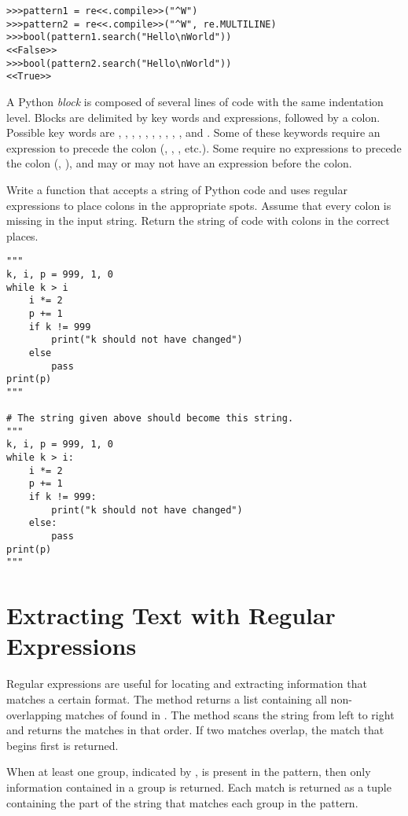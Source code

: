 \begin{lstlisting}
>>>pattern1 = re<<.compile>>("^W")
>>>pattern2 = re<<.compile>>("^W", re.MULTILINE)
>>>bool(pattern1.search("Hello\nWorld"))
<<False>>
>>>bool(pattern2.search("Hello\nWorld"))
<<True>>
\end{lstlisting}

\begin{problem}
A Python \emph{block} is composed of several lines of code with the same indentation level.
Blocks are delimited by key words and expressions, followed by a colon.
Possible key words are , , , , , , , , , , and .
Some of these keywords require an expression to precede the colon (, , , etc.).
Some require no expressions to precede the colon (, ), and  may or may not have an expression before the colon.

Write a function that accepts a string of Python code and uses regular expressions to place colons in the appropriate spots.
Assume that every colon is missing in the input string.
Return the string of code with colons in the correct places.

\begin{lstlisting}
"""
k, i, p = 999, 1, 0
while k > i
    i *= 2
    p += 1
    if k != 999
        print("k should not have changed")
    else
        pass
print(p)
"""

# The string given above should become this string.
"""
k, i, p = 999, 1, 0
while k > i:
    i *= 2
    p += 1
    if k != 999:
        print("k should not have changed")
    else:
        pass
print(p)
"""
\end{lstlisting}
\end{problem}

\section*{Extracting Text with Regular Expressions} %

Regular expressions are useful for locating and extracting information that matches a certain format.
The method  returns a list containing all non-overlapping matches of  found in .
The method scans the string from left to right and returns the matches in that order.
If two matches overlap, the match that begins first is returned.

When at least one group, indicated by \li{()}, is present in the pattern, then only information contained in a group is returned. Each match is returned as a tuple containing the part of the string that matches each group in the pattern.

